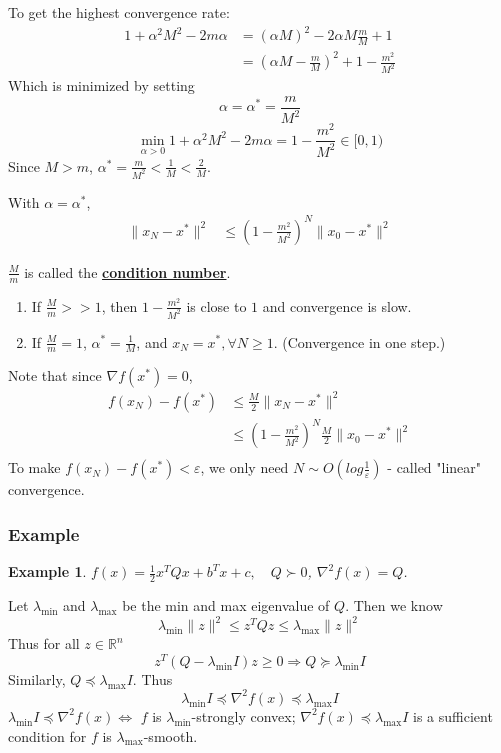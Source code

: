 \documentclass[11pt,a4paper]{article}
\newtheorem{example}{Example}
\begin{document}
To get the highest convergence rate:
\begin{equation}
    \begin{aligned}
        1+\alpha^2M^2-2m\alpha&=(\alpha M)^2-2\alpha M\frac{m}{M}+1\\
        &=(\alpha M-\frac{m}{M})^2+1-\frac{m^2}{M^2}
    \end{aligned}
    \nonumber
\end{equation}
Which is minimized by setting $$\alpha=\alpha^*=\frac{m}{M^2}$$
$$\min_{\alpha>0}1+\alpha^2M^2-2m\alpha=1-\frac{m^2}{M^2}\in[0,1)$$
Since $M>m$, $\alpha^*=\frac{m}{M^2}<\frac{1}{M}<\frac{2}{M}$.

With $\alpha=\alpha^*$,
\begin{equation}
    \begin{aligned}
        \|x_{N}-x^*\|^2&\leq (1-\frac{m^2}{M^2})^N\|x_0-x^*\|^2
    \end{aligned}
    \nonumber
\end{equation}

$\frac{M}{m}$ is called the \textbf{\underline{condition number}}.
\begin{enumerate}[$\bullet$]
    \item If $\frac{M}{m}>>1$, then $1-\frac{m^2}{M^2}$ is close to $1$ and convergence is slow.
    \item If $\frac{M}{m}=1$, $\alpha^*=\frac{1}{M}$, and $x_N=x^*,\forall N\geq 1$. (Convergence in one step.)
\end{enumerate}
Note that since $\nabla f(x^*)=0$,
\begin{equation}
    \begin{aligned}
        f(x_N)-f(x^*)&\leq \frac{M}{2}\|x_N-x^*\|^2\\
        &\leq (1-\frac{m^2}{M^2})^N\frac{M}{2}\|x_0-x^*\|^2\\
    \end{aligned}
    \nonumber
\end{equation}
To make $f(x_N)-f(x^*)<\varepsilon$, we only need $N\sim O(log\frac{1}{\varepsilon})$ - called "linear" convergence.

\subsubsection{Example}
\begin{example}
    $f(x)=\frac{1}{2}x^TQx+b^Tx+c,\quad Q\succ 0$, $\nabla^2 f(x)=Q$.
\end{example}
Let $\lambda_{\min}$ and $\lambda_{\max}$ be the min and max eigenvalue of $Q$. Then we know $$\lambda_{\min}\|z\|^2\leq z^TQz\leq \lambda_{\max}\|z\|^2$$
Thus for all $z\in \mathbb{R}^n$
$$z^T(Q-\lambda_{\min}I)z\geq 0 \Rightarrow	Q\succeq \lambda_{\min}I$$
Similarly, $Q\preceq \lambda_{\max}I$. Thus
$$\lambda_{\min}I\preceq \nabla^2 f(x)\preceq \lambda_{\max}I$$
$\lambda_{\min}I\preceq \nabla^2 f(x) \Leftrightarrow$ $f$ is $\lambda_{\min}$-strongly convex; $\nabla^2 f(x)\preceq \lambda_{\max}I$ is a sufficient condition for $f$ is $\lambda_{\max}$-smooth.
\end{document}
